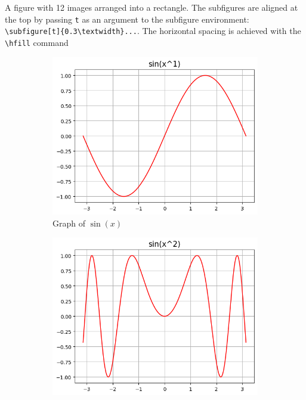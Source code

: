 \documentclass{article}
\begin{document}
    \pagebreak

    A figure with 12 images arranged into a rectangle. The subfigures are aligned at the top by passing \texttt{t} as an argument to the subfigure
    environment: \texttt{\textbackslash subfigure[t]\{0.3\textbackslash textwidth\}...}. The horizontal spacing is achieved with the \texttt{\textbackslash hfill} command

    \begin{figure}[h!]
        \centering
        \caption{Different trigonometric and hyperbolic functions plotted on the domain $[-1, 1]$ where each successive picture in a row has a greater power of $x$ in the argument}
        \label{fig:params}
        \begin{subfigure}[t]{0.3\textwidth}
            \includegraphics[width=\textwidth]{params/sin-x1.png}
            \caption{Graph of $\sin(x)$}
            \label{fig:sin-x1}
        \end{subfigure}
        \hfill
        \begin{subfigure}[t]{0.3\textwidth}
            \includegraphics[width=\textwidth]{params/sin-x2.png}

\end{subfigure}
\end{figure}
\end{document}
